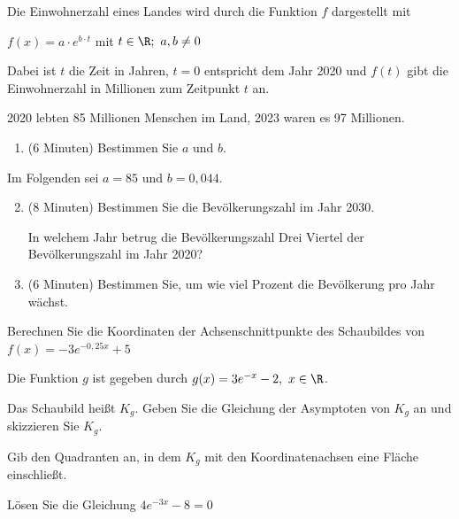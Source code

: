 \begin{Exercise}[title={Zeitansatz 20 min, mit Taschenrechner}, label=eFktVA_3]%

    Die Einwohnerzahl eines Landes wird durch die Funktion \(f\) dargestellt mit

    \(f(x)=a\cdot e^{b\cdot t}\) mit \(t\in\R;\ a,b\neq0\)

    Dabei ist \(t\) die Zeit in Jahren, \(t=0\) entspricht dem Jahr 2020 und \(f(t)\) gibt die Einwohnerzahl in Millionen zum Zeitpunkt \(t\) an.

    2020 lebten 85 Millionen Menschen im Land, 2023 waren es 97 Millionen.

    \begin{enumerate}[label=\alph*)]
        \item (6 Minuten) Bestimmen Sie \(a\) und \(b\).
    \end{enumerate}

    Im Folgenden sei \(a=85\) und \(b=0,044\).

    \begin{enumerate}[label=\alph*)]
        \setcounter{enumi}{1}
        \item (8 Minuten) Bestimmen Sie die Bevölkerungszahl im Jahr 2030.

        In welchem Jahr betrug die Bevölkerungszahl Drei Viertel der Bevölkerungszahl im Jahr 2020?
        \item (6 Minuten) Bestimmen Sie, um wie viel Prozent die Bevölkerung pro Jahr wächst.
    \end{enumerate}
\end{Exercise}
\begin{Exercise}[title={Zeitansatz 6 min, mit Taschenrechner}, label=eFktVA_4]%

    Berechnen Sie die Koordinaten der Achsenschnittpunkte des Schaubildes von \(f(x)=-3e^{-0,25x}+5\)
\end{Exercise}
\begin{Exercise}[title={Zeitansatz 10 min, ohne Taschenrechner}, label=eFktVA_5]%

    Die Funktion \(g\) ist gegeben durch \(g(x)=3e^{-x}-2,\ x\in\R\).

    Das Schaubild heißt \(K_g\). Geben Sie die Gleichung der Asymptoten von \(K_g\) an und skizzieren Sie \(K_g\).

    Gib den Quadranten an, in dem \(K_g\) mit den Koordinatenachsen eine Fläche einschließt.
\end{Exercise}
\begin{Exercise}[title={Zeitansatz 6 min, ohne Taschenrechner}, label=eFktVA_6]%

    Lösen Sie die Gleichung \(4e^{-3x}-8=0\)
\end{Exercise}

